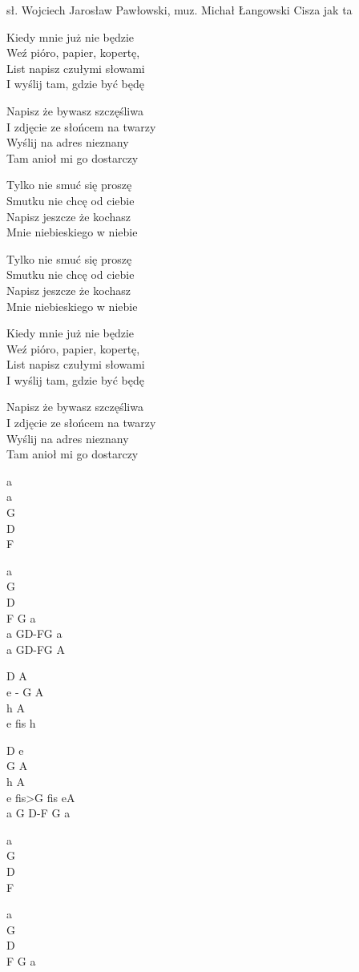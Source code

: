 {sł. Wojciech Jarosław Pawłowski, muz. Michał Łangowski}
{Cisza jak ta}
\begin{text}
\ifOneCol \else \footnotesize{\fi
    \hfill\break
Kiedy mnie już nie będzie\\
Weź pióro, papier, kopertę,\\
List napisz czułymi słowami\\
I wyślij tam, gdzie być będę

Napisz że bywasz szczęśliwa\\
I zdjęcie ze słońcem na twarzy\\
Wyślij na adres nieznany\\
Tam anioł mi go dostarczy

    \hfill\break
    \hfill\break
\vin Tylko nie smuć się proszę\\
\vin Smutku nie chcę od ciebie\\
\vin Napisz jeszcze że kochasz\\
\vin Mnie niebieskiego w niebie

\vin Tylko nie smuć się proszę\\
\vin Smutku nie chcę od ciebie\\
\vin Napisz jeszcze że kochasz\\
\vin Mnie niebieskiego w niebie

    \hfill\break
Kiedy mnie już nie będzie\\
Weź pióro, papier, kopertę,\\
List napisz czułymi słowami\\
I wyślij tam, gdzie być będę

Napisz że bywasz szczęśliwa\\
I zdjęcie ze słońcem na twarzy\\
Wyślij na adres nieznany\\
Tam anioł mi go dostarczy
\ifOneCol \else }\fi
\end{text}
\begin{chord}
\ifOneCol \else \footnotesize{\fi
a\\
a\\
G\\
D\\
F

a\\
G\\
D\\
F G a\\
a GD-FG a\\
a GD-FG A

D A\\
e - G A\\
h A\\
e fis h

D e\\
G A\\
h A\\
e fis>G fis eA\\
a G D-F G a

a\\
G\\
D\\
F

a\\
G\\
D\\
F G a
\ifOneCol \else }\fi
\end{chord}
